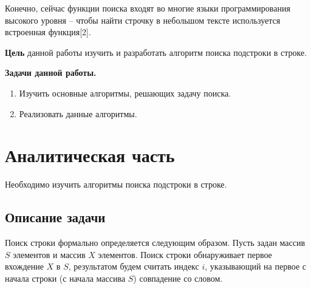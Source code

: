 \documentclass[a4paper,14pt]{article} %
\begin{document}
	Конечно, сейчас функции поиска входят во многие языки программирования высокого уровня – чтобы найти строчку в небольшом тексте используется встроенная функция[2]. 
	
	\hfill
	
	\textbf{Цель} данной работы изучить и разработать алгоритм поиска подстроки в строке. 
	
	\textbf{Задачи данной работы. }
	\begin{enumerate}
	\item Изучить основные алгоритмы, решающих задачу поиска. 
	\item Реализовать данные алгоритмы. 
	\end{enumerate}

	\newpage


        \section{Аналитическая часть}
        \hfill

        Необходимо изучить алгоритмы поиска подстроки в строке. 

        \subsection{Описание задачи}
        \hfill
        
        Поиск строки формально определяется следующим образом. Пусть задан массив $S$ элементов и массив $X$ элементов. Поиск строки обнаруживает первое вхождение $X$ в $S$, результатом будем считать индекс $i$, указывающий на первое с начала строки (с начала массива $S$) совпадение со словом.
        
\end{document}

